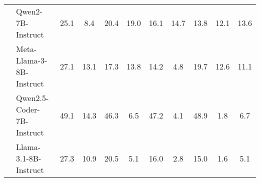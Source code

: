 \begin{table*}[h]
{\begin{tabular}{clccccccccc}
\multicolumn{1}{c|}{\multirow{4}{*}{}} & Qwen2-7B-Instruct & 25.1 & 8.4 & 20.4 & 19.0 & 16.1 & 14.7 & 13.8 & 12.1 & 13.6 \\
\multicolumn{1}{c|}{\multirow{4}{*}{}} & Meta-Llama-3-8B-Instruct & 27.1 & 13.1 & 17.3 & 13.8 & 14.2 & 4.8 & 19.7 & 12.6 & 11.1 \\
\multicolumn{1}{c|}{\multirow{4}{*}{}} & Qwen2.5-Coder-7B-Instruct & 49.1 & 14.3 & 46.3 & 6.5 & 47.2 & 4.1 & 48.9 & 1.8 & 6.7 \\
\multicolumn{1}{c|}{\multirow{4}{*}{}} & Llama-3.1-8B-Instruct & 27.3 & 10.9 & 20.5 & 5.1 & 16.0 & 2.8 & 15.0 & 1.6 & 5.1 \\

\hline
\end{tabular}
\vspace{-5pt}
}
\end{table*}









